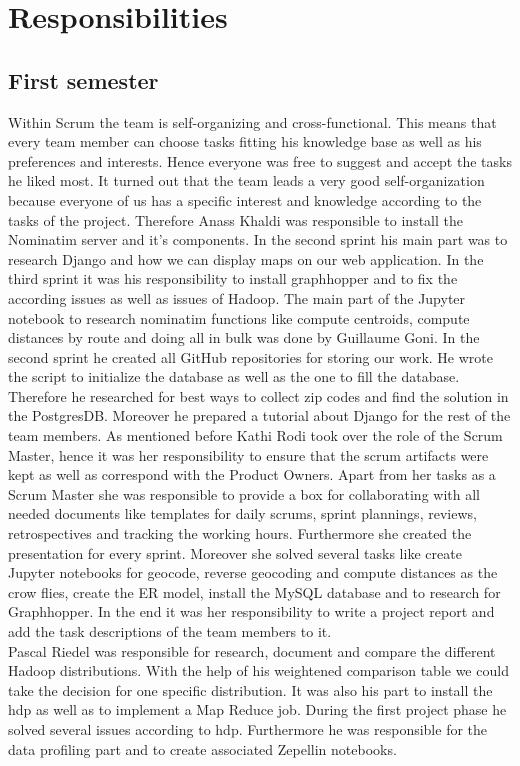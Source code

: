
\section{Responsibilities}

\subsection{First semester}

Within Scrum the team is self-organizing and cross-functional. This means that every
team member can choose tasks fitting his knowledge base as well as his preferences
and interests. Hence everyone was free to suggest and accept the tasks he liked
most.
It turned out that the team leads a very good self-organization because
everyone of us has a specific interest and knowledge according to the tasks of
the project.
Therefore Anass Khaldi was responsible to install the Nominatim server
and it's components. In the second sprint his main part was to research Django
and how we can display maps on our web application. In the third sprint it was
his responsibility to install graphhopper and to fix the according issues as well
as issues of Hadoop.
The main part of the Jupyter notebook to research nominatim functions like compute
centroids, compute distances by route and doing all in bulk was done by Guillaume
Goni. In the second sprint he created all GitHub repositories for storing our work.
He wrote the script to initialize the database as well as the one to fill the database.
Therefore he researched for best ways to collect zip codes and find the solution
in the PostgresDB.\@
Moreover he prepared a tutorial about Django for the rest of the team members.
As mentioned before Kathi Rodi took over the role of the Scrum Master, hence it
was her responsibility to ensure that the scrum artifacts were kept as well as
correspond with the Product Owners. Apart from her tasks as a Scrum Master she
was responsible to provide a box for collaborating with all needed documents like
templates for daily scrums, sprint plannings, reviews, retrospectives and tracking
the working hours. Furthermore she created the presentation for every sprint.
Moreover she solved several tasks like create Jupyter notebooks for geocode,
reverse geocoding and compute distances as the crow flies, create the ER model,
install the MySQL database and to research for Graphhopper.
In the end it was her responsibility to write a project report and add the task
descriptions of the team members to it.\\Pascal Riedel was responsible for research,
document and compare the different Hadoop distributions. With the help of his
weightened comparison table we could take the decision for one specific distribution.
It was also his part to install the \acs{hdp} as well as to implement a Map Reduce job.
During the first project phase he solved several issues according to \acs{hdp}.
Furthermore he was responsible for the data profiling part and to create associated
Zepellin notebooks.

